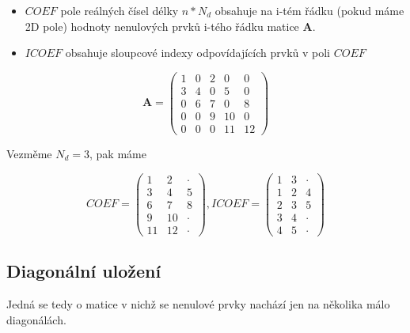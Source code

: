 \documentclass[../main.tex]{subfiles}
\begin{document}
\begin{itemize}
    \item $COEF$ pole reálných čísel délky $n * N_d$ obsahuje na i-tém řádku (pokud máme 2D pole) hodnoty nenulových prvků
    i-tého řádku matice $\mathbf{A}$.
    \item $ICOEF$ obsahuje sloupcové indexy odpovídajících prvků v poli $COEF$
\end{itemize}


\begin{example}
    \begin{equation}\label{eq:example-diagonal}
        \mathbf{A} = \begin{pmatrix}
            1 & 0 & 2 & 0 & 0 \\
            3 & 4 & 0 & 5 & 0 \\
            0 & 6 & 7 & 0 & 8 \\
            0 & 0 & 9 & 10 & 0 \\
            0 & 0 & 0 & 11 & 12 
            \end{pmatrix}
    \end{equation}

    Vezměme $N_d = 3$, pak máme
    
    \begin{equation*}
        COEF = \begin{pmatrix}
            1 & 2 & \cdot \\
            3 & 4 & 5 \\
            6 & 7 & 8 \\
            9 & 10 & \cdot \\
            11 & 12 & \cdot 
            \end{pmatrix}
        , ICOEF = \begin{pmatrix}
            1 & 3 & \cdot \\
            1 & 2 & 4 \\
            2 & 3 & 5 \\
            3 & 4 & \cdot \\
            4 & 5 & \cdot 
            \end{pmatrix} 
    \end{equation*}    
\end{example}

\subsection{Diagonální uložení}
Jedná se tedy o matice v nichž se nenulové prvky nachází jen na několika málo diagonálách.
\end{document}
